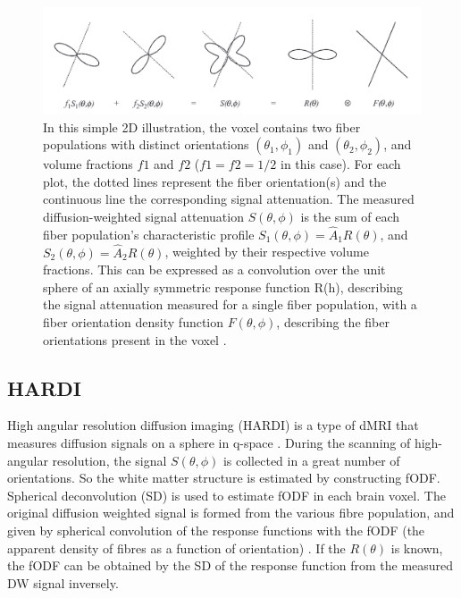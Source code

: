 \begin{figure}[ht]
    \centering
    \includegraphics[width= 15cm]{figures/2D.png}
        \caption{In this simple 2D illustration, the voxel contains two fiber populations with distinct orientations
         $(\theta_{1} ,\phi_{1})$ and $(\theta_{2} ,\phi_{2})$, and volume fractions $f1$ and $f2$ ($f1 = f2 = 1/2$ in this case). 
         For each plot, the dotted lines represent the fiber orientation(s) and the continuous line the corresponding signal attenuation. 
         The measured diffusion-weighted signal attenuation $S(\theta, \phi)$ is the sum of each fiber population’s characteristic profile $S_{1}(\theta, \phi) = \hat{A}_{1}R(\theta)$, and $S_{2}(\theta, \phi) = \hat{A}_{2}R(\theta)$, 
         weighted by their respective volume fractions. This can be expressed as a convolution over the unit sphere of an axially symmetric response function R(h), 
         describing the signal attenuation measured for a single fiber population, with a fiber orientation density function $F(\theta ,\phi)$, 
         describing the fiber orientations present in the voxel \cite{tournierDirectEstimationFiber2004}. }
    \label{fig:2dconv}
\end{figure}

\subsection{HARDI}
High angular resolution diffusion imaging (HARDI) is a type of dMRI that measures diffusion signals on a sphere in q-space \cite{consagraOptimizedDiffusionImaging2022}.
During the scanning of high-angular resolution, the signal $S(\theta, \phi)$ is collected in a great number of orientations.
So the white matter structure is estimated by constructing fODF. Spherical deconvolution (SD) is used to estimate fODF in each brain voxel. 
The original diffusion weighted signal is formed from the
various fibre population, and given by spherical convolution of the response functions with the fODF (the apparent density of fibres as a function of orientation) \cite{jeurissenMultitissueConstrainedSpherical2014}. 
If the $R(\theta)$ is known, the fODF can be obtained by the SD of the response function from the measured DW signal inversely.

